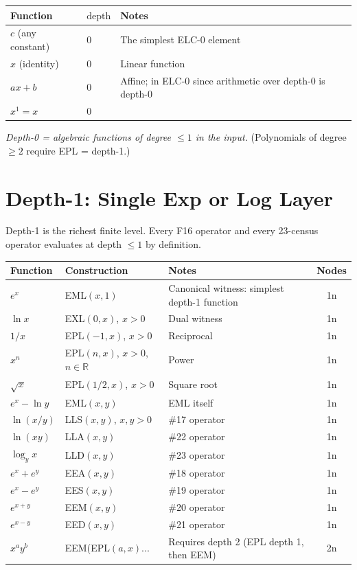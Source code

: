 \documentclass[11pt]{article}
\begin{document}
\begin{center}
\begin{tabular}{lll}
\toprule
Function & $\mathrm{depth}$ & Notes \\
\midrule
$c$ (any constant) & 0 & The simplest ELC-0 element \\
$x$ (identity) & 0 & Linear function \\
$ax + b$ & 0 & Affine; in ELC-0 since arithmetic over depth-0 is depth-0 \\
$x^1 = x$ & 0 & \\
\bottomrule
\end{tabular}
\end{center}

\noindent \emph{Depth-0 = algebraic functions of degree $\leq 1$ in the input.}
(Polynomials of degree $\geq 2$ require EPL = depth-1.)

\section{Depth-1: Single Exp or Log Layer}
\label{sec:depth1}

Depth-1 is the richest finite level. Every F16 operator and every 23-census
operator evaluates at depth $\leq 1$ by definition.

\begin{center}
\begin{longtable}{lllc}
\toprule
Function & Construction & Notes & Nodes \\
\midrule
$e^x$ & EML$(x,1)$ & Canonical witness: simplest depth-1 function & 1n \\
$\ln x$ & EXL$(0,x)$, $x>0$ & Dual witness & 1n \\
$1/x$ & EPL$(-1,x)$, $x>0$ & Reciprocal & 1n \\
$x^n$ & EPL$(n,x)$, $x>0$, $n\in\mathbb{R}$ & Power & 1n \\
$\sqrt{x}$ & EPL$(1/2,x)$, $x>0$ & Square root & 1n \\
$e^x - \ln y$ & EML$(x,y)$ & EML itself & 1n \\
$\ln(x/y)$ & LLS$(x,y)$, $x,y>0$ & \#17 operator & 1n \\
$\ln(xy)$ & LLA$(x,y)$ & \#22 operator & 1n \\
$\log_y x$ & LLD$(x,y)$ & \#23 operator & 1n \\
$e^x + e^y$ & EEA$(x,y)$ & \#18 operator & 1n \\
$e^x - e^y$ & EES$(x,y)$ & \#19 operator & 1n \\
$e^{x+y}$ & EEM$(x,y)$ & \#20 operator & 1n \\
$e^{x-y}$ & EED$(x,y)$ & \#21 operator & 1n \\
$x^a y^b$ & EEM(EPL$(a,x)$... & Requires depth 2 (EPL depth 1, then EEM) & 2n \\
\bottomrule
\end{longtable}
\end{center}
\end{document}
